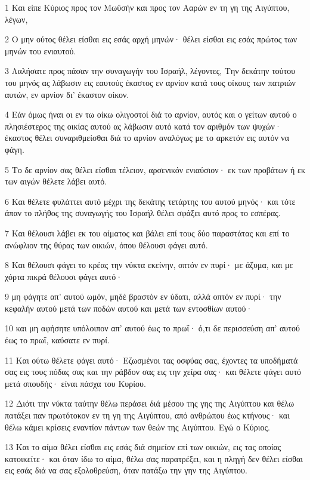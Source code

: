 \par 1 Και είπε Κύριος προς τον Μωϋσήν και προς τον Ααρών εν τη γη της Αιγύπτου, λέγων,
\par 2 Ο μην ούτος θέλει είσθαι εις εσάς αρχή μηνών· θέλει είσθαι εις εσάς πρώτος των μηνών του ενιαυτού.
\par 3 Λαλήσατε προς πάσαν την συναγωγήν του Ισραήλ, λέγοντες, Την δεκάτην τούτου του μηνός ας λάβωσιν εις εαυτούς έκαστος εν αρνίον κατά τους οίκους των πατριών αυτών, εν αρνίον δι' έκαστον οίκον.
\par 4 Εάν όμως ήναι οι εν τω οίκω ολιγοστοί διά το αρνίον, αυτός και ο γείτων αυτού ο πλησιέστερος της οικίας αυτού ας λάβωσιν αυτό κατά τον αριθμόν των ψυχών· έκαστος θέλει συναριθμείσθαι διά το αρνίον αναλόγως με το αρκετόν εις αυτόν να φάγη.
\par 5 Το δε αρνίον σας θέλει είσθαι τέλειον, αρσενικόν ενιαύσιον· εκ των προβάτων ή εκ των αιγών θέλετε λάβει αυτό.
\par 6 Και θέλετε φυλάττει αυτό μέχρι της δεκάτης τετάρτης του αυτού μηνός· και τότε άπαν το πλήθος της συναγωγής του Ισραήλ θέλει σφάξει αυτό προς το εσπέρας.
\par 7 Και θέλουσι λάβει εκ του αίματος και βάλει επί τους δύο παραστάτας και επί το ανώφλιον της θύρας των οικιών, όπου θέλουσι φάγει αυτό.
\par 8 Και θέλουσι φάγει το κρέας την νύκτα εκείνην, οπτόν εν πυρί· με άζυμα, και με χόρτα πικρά θέλουσι φάγει αυτό·
\par 9 μη φάγητε απ' αυτού ωμόν, μηδέ βραστόν εν ύδατι, αλλά οπτόν εν πυρί· την κεφαλήν αυτού μετά των ποδών αυτού και μετά των εντοσθίων αυτού·
\par 10 και μη αφήσητε υπόλοιπον απ' αυτού έως το πρωΐ· ό,τι δε περισσεύση απ' αυτού έως το πρωΐ, καύσατε εν πυρί.
\par 11 Και ούτω θέλετε φάγει αυτό· Εζωσμένοι τας οσφύας σας, έχοντες τα υποδήματά σας εις τους πόδας σας και την ράβδον σας εις την χείρα σας· και θέλετε φάγει αυτό μετά σπουδής· είναι πάσχα του Κυρίου.
\par 12 Διότι την νύκτα ταύτην θέλω περάσει διά μέσου της γης της Αιγύπτου και θέλω πατάξει παν πρωτότοκον εν τη γη της Αιγύπτου, από ανθρώπου έως κτήνους· και θέλω κάμει κρίσεις εναντίον πάντων των θεών της Αιγύπτου. Εγώ ο Κύριος.
\par 13 Και το αίμα θέλει είσθαι εις εσάς διά σημείον επί των οικιών, εις τας οποίας κατοικείτε· και όταν ίδω το αίμα, θέλω σας παρατρέξει, και η πληγή δεν θέλει είσθαι εις εσάς διά να σας εξολοθρεύση, όταν πατάξω την γην της Αιγύπτου.
